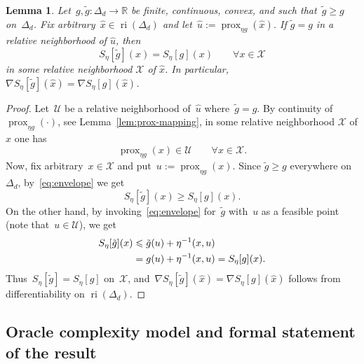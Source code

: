 \documentclass[11pt]{article}
\numberwithin{equation}{section}
\let\le\leqslant
\let\ge\geqslant
\newtheorem{lemma}[theorem]{Lemma}
\theoremstyle{remark}
\newcommand{\ri}{\operatorname{ri}}
\newcommand{\Env}{S}
\let\Div\relax\newcommand{\Div}{D_h}
\newcommand{\Simp}{\Delta_d}
\newcommand{\prox}{\operatorname{prox}}
\newcommand{\1}{\mathbf{1}}
\newcommand{\bnabla}{\nabla}
\begin{document}
\begin{lemma}%
\label{lem:right-bm-locality}
Let~$g,\tilde g:\Simp\to\mathbb{R}$ be finite, continuous, convex, and such that~$\tilde g\ge g$ on~$\Simp$. 
Fix arbitrary~$\hat x\in\ri(\Simp)$ and let~$\hat u:=\prox_{\eta g}(\hat x)$. 
If $\tilde g=g$ in a relative neighborhood of $\hat u$, then %
\begin{equation}
\label{eq:right-bm-locality-equality}
    \Env_\eta[\tilde g](x)=\Env_\eta[g](x)
    \qquad \forall x \in \mathcal{X}
\end{equation}
in some relative neighborhood $\mathcal{X}$ of $\hat x$. 
In particular,~$\bnabla\Env_\eta[\tilde g](\hat x)= \bnabla \Env_\eta[g](\hat x)$.
\end{lemma}

\begin{proof}
Let~$\mathcal{U}$ be a relative neighborhood of~$\hat u$ where~$\tilde g=g$. 
By continuity of~$\prox_{\eta g}(\cdot)$, see Lemma~\ref{lem:prox-mapping}, in some relative neighborhood $\mathcal{X}$ of $\hat x$ one has
\[
\prox_{\eta g}(x) \in \mathcal{U} \qquad \forall x \in \mathcal{X}.
\]  
Now, fix arbitrary~$x \in \mathcal{X}$ and put~$u := \prox_{\eta g}(x)$. 
Since $\tilde g \ge g$ everywhere on~$\Simp$, by~\eqref{eq:envelope} we get
\begin{equation*}
    \Env_\eta[\tilde g](x)\ge \Env_\eta[g](x).
\end{equation*}
On the other hand, by invoking~\eqref{eq:envelope} for~$\tilde g$ with~$u$ as a feasible point (note that~$u \in \mathcal{U}$), we get
\begin{equation*}
\begin{aligned}
    \Env_\eta[\tilde g](x)
    &\le
    \tilde g(u)+\eta^{-1}\Div(x,u)
    \\
    &=
    g(u)+\eta^{-1}\Div(x,u)
    =
    \Env_\eta[g](x).
\end{aligned}
\end{equation*}
Thus~$\Env_{\eta} [\tilde g] = \Env_{\eta} [g]$ on~$\mathcal{X}$, and~$\bnabla\Env_\eta[\tilde g](\hat x)= \bnabla \Env_\eta[g](\hat x)$ follows from differentiability on $\ri(\Simp)$.
\end{proof}

%
\subsection{Oracle complexity model and formal statement of the result}
\label{sec:formal}
\end{document}
